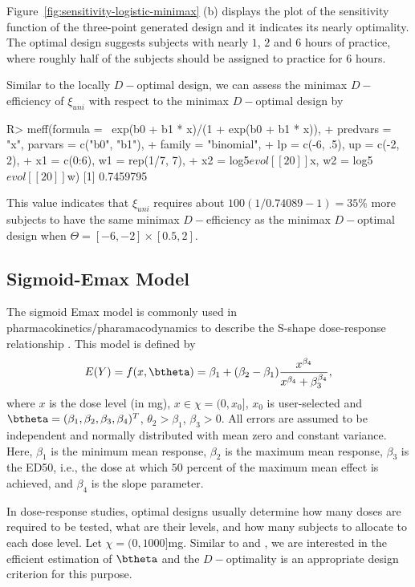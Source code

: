 Figure~\ref{fig:sensitivity-logistic-minimax} (b) displays the plot of the sensitivity function of the three-point generated design and it  indicates its nearly optimality.  
The optimal design  suggests subjects with nearly $1$, $2$ and $6$ hours of practice, where roughly half of the subjects should be  assigned to practice for $6$ hours.


Similar to the locally $D-$optimal design, we can assess the minimax $D-$efficiency of $\xi_{uni}$ with respect to the minimax $D-$optimal design by
\begin{example}
R> meff(formula = ~exp(b0 + b1 * x)/(1 + exp(b0 + b1 * x)),
+      predvars = "x", parvars = c("b0", "b1"),
+      family = "binomial",
+      lp = c(-6, .5), up = c(-2, 2),
+      x1 = c(0:6), w1 = rep(1/7, 7),
+      x2 = log5$evol[[20]]$x, w2 = log5$evol[[20]]$w)
[1] 0.7459795
\end{example}
This value indicates that  $\xi_{uni}$ requires about $100(1/0.74089-1) = 35\%$ more subjects to have the same minimax $D-$efficiency  as the minimax $D-$optimal design  when $\Theta = [-6, -2]\times[0.5, 2]$.


\subsection{Sigmoid-Emax Model}
\label{sec:sigmoid}
The sigmoid Emax model is commonly used in pharmacokinetics/pharamacodynamics to describe the S-shape dose-response relationship \citep[see, e.g.,][]{ Macdougall2006, Thomas2006}.
This model  is defined by
\begin{equation}
\label{eq:sigmoid-Emax}
E(Y) = f(x, \btheta) = \beta_1 + (\beta_2-\beta_1) \frac{x^{\beta_4}}{x^{\beta_4} + \beta_3^{\beta_4}},
\end{equation}
where $x$ is the dose level (in mg), $x \in \chi = (0, x_0]$, $x_0$ is user-selected and  $\btheta = (\beta_1, \beta_2, \beta_3, \beta_4)^T$, $\theta_2>\beta_1$,  $\beta_3>0$.
All  errors  are assumed to be independent and normally distributed with mean zero and constant variance. Here, $\beta_1$ is the minimum mean response, $\beta_2$ is the maximum mean response, $\beta_3$ is the ED50, i.e., the dose at which $50$ percent of the maximum mean effect is achieved, and $\beta_4$ is the slope parameter.



In dose-response studies, optimal designs  usually  determine how many doses are required to be tested, what are their levels, and how many subjects to allocate to each dose level.
Let  $\chi = (0, 1000]$mg.
Similar to \citet{dragalin2007adaptive} and \citet{wang2014adaptive}, we are interested in the efficient estimation of $\btheta$ and the $D-$optimality  is an appropriate design criterion for this purpose.

